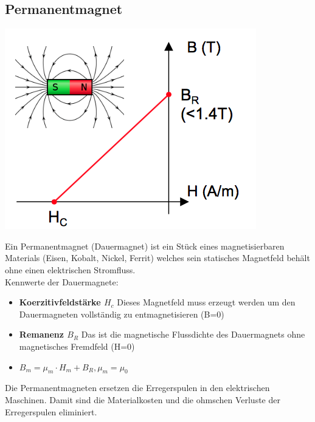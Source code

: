 \subsection{Permanentmagnet}

\begin{minipage}{0.3 \linewidth}
\includegraphics[width = \linewidth]{./Pics/VL2/permanentMagnet}
\end{minipage}
\begin{minipage}{0.7 \linewidth}
Ein Permanentmagnet (Dauermagnet) ist ein Stück eines magnetisierbaren Materials (Eisen, Kobalt, Nickel, Ferrit) welches sein statisches Magnetfeld behält ohne einen elektrischen Stromfluss. \\

Kennwerte der Dauermagnete:
\begin{itemize}
\item \textbf{Koerzitivfeldstärke $H_c$} Dieses Magnetfeld muss erzeugt werden um den Dauermagneten vollständig zu entmagnetisieren (B=0)
\item \textbf{Remanenz $B_R$} Das ist die magnetische Flussdichte des Dauermagnets ohne magnetisches Fremdfeld (H=0)
\item $B_m = \mu_m \cdot H_m + B_R , \mu_m = \mu_0$
\end{itemize}

Die Permanentmagneten ersetzen die Erregerspulen in den elektrischen Maschinen. Damit sind die Materialkosten und die ohmschen Verluste der Erregerspulen eliminiert. 
\end{minipage}

